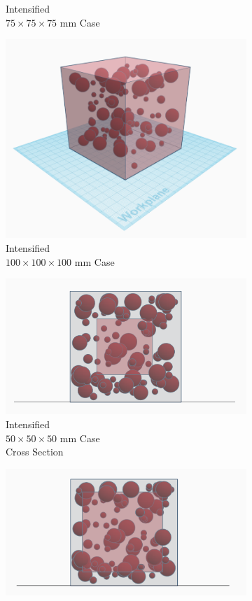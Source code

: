 \begin{figure}[ht]
\begin{subfigure}{.33\textwidth}
      \caption{Intensified  \\ $75 \times 75 \times 75$ mm Case}
    \end{subfigure}%
    \begin{subfigure}{.33\textwidth}
      \centering
      \includegraphics[width=.8\linewidth]{Files/DEF_X/X-1_3d.png}
      \caption{Intensified  \\ $100 \times 100 \times 100$ mm Case}
    \end{subfigure}
    \begin{subfigure}{.33\textwidth}
      \centering
      \includegraphics[width=.8\linewidth]{Files/DEF_X/X0_3ds.png}
      \caption{Intensified  \\ $50 \times 50 \times 50$ mm Case\\ Cross Section}
    \end{subfigure}%
    \begin{subfigure}{.33\textwidth}
      \centering
      \includegraphics[width=.8\linewidth]{Files/DEF_X/X-5_3ds.png}

\end{subfigure}
\end{figure}
